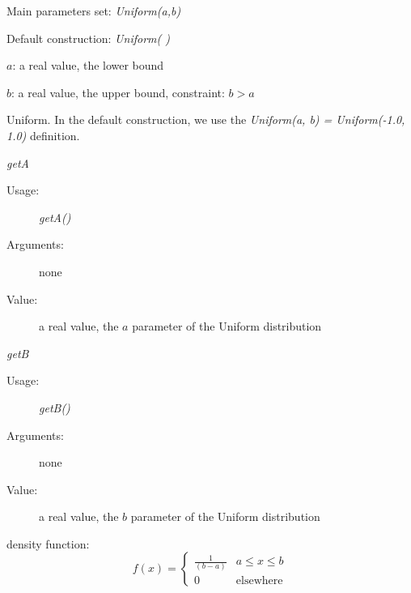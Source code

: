 \begin{description}

\item[Usage:] \rule{0pt}{1em}
\begin{description}
\item Main parameters set: \textit{Uniform(a,b)}
\item Default construction: \textit{Uniform( )}
\end{description}

\item[Arguments:]  \rule{0pt}{1em}
\begin{description}
\item $a$: a  real value, the lower bound
\item $b$: a real value, the upper bound, constraint: $b>a$
\end{description}

\item[Value:]  Uniform. In the default construction, we use the \textit{Uniform(a, b) = Uniform(-1.0, 1.0)} definition.

\item[Some methods:] \rule{0pt}{1em}
\begin{description}

\item \textit{getA}
\begin{description}
\item[Usage:] \textit{getA()}
\item[Arguments:] none
\item[Value:]  a real value, the $a$ parameter of the Uniform distribution
\end{description}
\bigskip

\item \textit{getB}
\begin{description}
\item[Usage:] \textit{getB()}
\item[Arguments:] none
\item[Value:]  a real value, the $b$ parameter of the Uniform distribution
\end{description}

\end{description}

\item[Details:]  \rule{0pt}{1em}
\begin{description}
\item density function:
\begin{equation}
f(x) =
\left\{
\begin{array}{ll}
\displaystyle \frac{1}{(b-a)} & a \leq x \leq b \\
0 & \mbox{elsewhere}
\end{array}
\right.
\end{equation}


\end{description}
\end{description}
